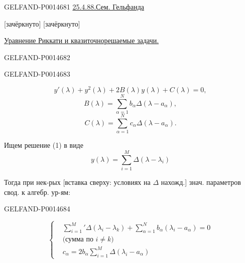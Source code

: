 \begin{GelfandAdjacentEvidence}{GELFAND-P001468}{1}
\underline{25.4.88.}\quad\underline{Сем. Гельфанда}

 [зачёркнуто]  [зачёркнуто]

\uline{Уравнение Риккати и квазиточнорешаемые задачи.}
\end{GelfandAdjacentEvidence}
\begin{GelfandAdjacentEvidence}{GELFAND-P001468}{2}

\end{GelfandAdjacentEvidence}
\begin{GelfandAdjacentEvidence}{GELFAND-P001468}{3}


\begin{equation*}
y'(\lambda)+y^2(\lambda)+2B(\lambda)y(\lambda)+C(\lambda)=0,
\tag{1}
\end{equation*}
\begin{equation*}
B(\lambda)=\sum_{\alpha=1}^N b_\alpha\Delta(\lambda-a_\alpha),
\tag{2}
\end{equation*}
\begin{equation*}
C(\lambda)=\sum_{\alpha=1}^N c_\alpha\Delta(\lambda-a_\alpha).
\tag{3}
\end{equation*}

Ищем решение (1) в виде
\begin{equation*}
y(\lambda)=\sum_{i=1}^M\Delta(\lambda-\lambda_i)
\tag{4}
\end{equation*}

Тогда при нек-рых [вставка сверху: условиях на \(\Delta\) нахожд.] знач. параметров свод. к алгебр. ур-ям:
\end{GelfandAdjacentEvidence}
\begin{GelfandAdjacentEvidence}{GELFAND-P001468}{4}


\begin{equation*}
\left\{
\begin{aligned}
&\sum_{i=1}^{M}{}'\Delta(\lambda_i-\lambda_k)
 +\sum_{\alpha=1}^{N}b_\alpha(\lambda_i-a_\alpha)=0\\
&\text{(сумма по }i\ne k\text{)}\\
&c_\alpha=2b_\alpha\sum_{i=1}^{M}\Delta(\lambda_i-a_\alpha)
\end{aligned}
\right.
\tag{5}
\end{equation*}
\end{GelfandAdjacentEvidence}
